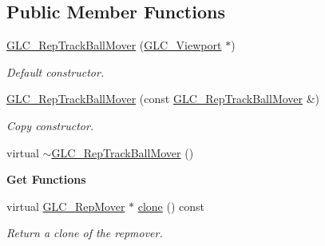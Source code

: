 \subsection*{Public Member Functions}
\begin{DoxyCompactItemize}
\item 
\hyperlink{class_g_l_c___rep_track_ball_mover_a225bfa978c3e73501e709dcf070dbe2d}{G\-L\-C\-\_\-\-Rep\-Track\-Ball\-Mover} (\hyperlink{class_g_l_c___viewport}{G\-L\-C\-\_\-\-Viewport} $\ast$)
\begin{DoxyCompactList}\small\item\em Default constructor. \end{DoxyCompactList}\item 
\hyperlink{class_g_l_c___rep_track_ball_mover_a94d275c3a522a022e9ef3c64ca502ef8}{G\-L\-C\-\_\-\-Rep\-Track\-Ball\-Mover} (const \hyperlink{class_g_l_c___rep_track_ball_mover}{G\-L\-C\-\_\-\-Rep\-Track\-Ball\-Mover} \&)
\begin{DoxyCompactList}\small\item\em Copy constructor. \end{DoxyCompactList}\item 
virtual \hyperlink{class_g_l_c___rep_track_ball_mover_a8c85c5dc84b48649c4a9773a5a7c07d4}{$\sim$\-G\-L\-C\-\_\-\-Rep\-Track\-Ball\-Mover} ()
\end{DoxyCompactItemize}
\begin{Indent}{\bf Get Functions}\par
\begin{DoxyCompactItemize}
\item 
virtual \hyperlink{class_g_l_c___rep_mover}{G\-L\-C\-\_\-\-Rep\-Mover} $\ast$ \hyperlink{class_g_l_c___rep_track_ball_mover_ad5e5c8c4ab0eb3603862ae2fead8eaf1}{clone} () const 
\begin{DoxyCompactList}\small\item\em Return a clone of the repmover. \end{DoxyCompactList}\end{DoxyCompactItemize}
\end{Indent}
